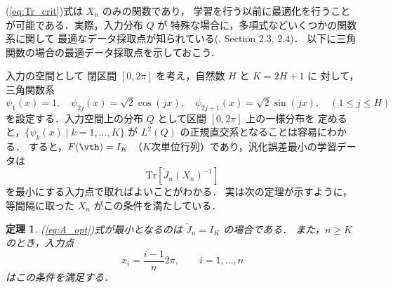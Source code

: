 \documentclass[master]{cimt}
\newtheorem{thm}{定理}
\newcommand{\trace}{\text{Tr}}
\begin{document}
(\ref{eq:Tr_crit})式は $X_n$ のみの関数であり，
学習を行う以前に最適化を行うことが可能である．実際，入力分布 $Q$ が
特殊な場合に，多項式などいくつかの関数系に関して
最適なデータ採取点が知られている(\cite{Fedorov}, Section 2.3, 2.4)．
以下に三角関数の場合の最適データ採取点を示しておこう．

入力の空間として
閉区間 $[0, 2\pi]$ を考え，自然数 $H$ と $K = 2H+1$ に
対して，三角関数系
\begin{equation*}
	\psi_1(x) =  1,	\quad 
	\psi_{2j}(x) =  \sqrt{2} \cos(jx), \quad 
	\psi_{2j+1}(x) =  \sqrt{2} \sin(jx), \quad ( 1\leq j \leq H)
\end{equation*}
を設定する．入力空間上の分布 $Q$ として区間 $[0,2\pi]$ 上の一様分布を
定めると，$\{ \psi_k(x) \mid k=1, \ldots, K\}$ が
$L^2(Q)$ の正規直交系となることは容易にわかる．
すると，$F(\vth) = I_K$ （$K$次単位行列）であり，汎化誤差最小の学習データは
\begin{equation}
\label{eq:A_opt}
	\trace [ \tilde{J}_n(X_n)^{-1} ]
\end{equation}
を最小にする入力点で取ればよいことがわかる．
実は次の定理が示すように，等間隔に取った $X_n$ がこの条件を満たしている．
\begin{thm}
(\ref{eq:A_opt})式が最小となるのは $\tilde{J}_n = I_K$ の場合である．
また，$n \geq K$ のとき，入力点
\begin{equation*}
	x_i =  \frac{i-1}{n} 2\pi,\qquad i=1, \ldots, n
\end{equation*}
はこの条件を満足する．
\end{thm}
\end{document}
